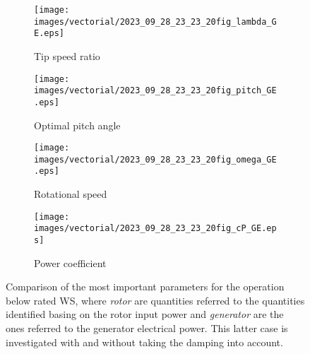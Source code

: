 \begin{figure}[htb]
  \begin{subfigure}{0.5\textwidth}
    \centering
    \texttt{[image: images/vectorial/2023\_09\_28\_23\_23\_20fig\_lambda\_GE.eps]}
    \caption{Tip speed ratio}
    \label{fig:2023_06_24_15_57_04fig_lambda_GE}
  \end{subfigure}
  \begin{subfigure}{0.5\textwidth}
    \centering
    \texttt{[image: images/vectorial/2023\_09\_28\_23\_23\_20fig\_pitch\_GE.eps]}
    \caption{Optimal pitch angle}
    \label{fig:2023_06_24_15_57_04fig_pitch_GE}
  \end{subfigure}
  \begin{subfigure}{0.5\textwidth}
    \centering
    \texttt{[image: images/vectorial/2023\_09\_28\_23\_23\_20fig\_omega\_GE.eps]}
    \caption{Rotational speed}
    \label{fig:2023_07_10_14_18_25fig_omega_GE}
  \end{subfigure}
  \begin{subfigure}{0.5\textwidth}
    \centering
    \texttt{[image: images/vectorial/2023\_09\_28\_23\_23\_20fig\_cP\_GE.eps]}
    \caption{Power coefficient}
    \label{fig:2023_06_24_15_57_04fig_cP_GE}
  \end{subfigure}
  \caption{Comparison of the most important parameters for the operation below rated WS, where \textit{rotor} are quantities referred to the quantities identified basing on the rotor input power and \textit{generator} are the ones referred to the generator electrical power. This latter case is investigated with and without taking the damping into account.}
  \label{fig:parameters_for_below_rated}
\end{figure}

